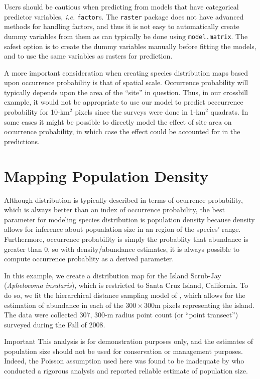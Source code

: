 \documentclass[a4paper]{article}
\begin{document}
Users should be cautious when predicting from models that have
categorical predictor variables, \emph{i.e.} \verb+factor+s. The
\texttt{raster} package does not have advanced methods for handling
factors, and thus it is not easy to automatically create dummy
variables from them as can typically be done using
\verb+model.matrix+. The safest option is to create the dummy
variables manually before fitting the models, and to use the same
variables as rasters for prediction.

A more important consideration when creating species distribution maps
based upon occurrence probability is that of spatial scale. Occurrence
probability will typically depends upon the area of the ``site'' in
question. Thus, in our crossbill example, it would not be appropriate
to use our model to predict occcurrence probability for 10-km$^2$
pixels since the surveys were done in 1-km$^2$ quadrats. In some
cases it might be possible to directly model the effect of site area
on occurrence probability, in which case the effect could be accounted
for in the predictions.

\section*{Mapping Population Density}

Although distribution is typically described in terms of
ocurrence probability, which is always better than an index of
occurrence probability, the best parameter for modeling species
distribution is population density because density allows for
inference about popualation size in an region of
the species' range. Furthermore, occurrence probability is simply the
probablity that abundance is greater than 0, so with density/abundance
estimates, it is always possible to compute occurrence probablity as a
derived parameter.

In this example, we create a distribution map for the Island Scrub-Jay
(\textit{Aphelocoma insularis}), which is restricted to Santa Cruz
Island, California. To do so, we fit the hierarchical distance
sampling model of \citet{royle_modeling_2004}, which allows for the
estimation of abundance in each of the $300 \times 300$m pixels
representing the island. The data were collected 307, 300-m radius
point count (or ``point transect'') surveyed during the Fall of 2008.

{\color{red} Important} This analysis is for demonstration
purposes only, and the estimates of population size should not be used
for conservation or management purposes. Indeed, the Poisson
assumption used here was found to be inadequate by
\citet{sillett_etal:2012} who conducted a rigorous analysis and
reported reliable estimate of population size.
\end{document}
